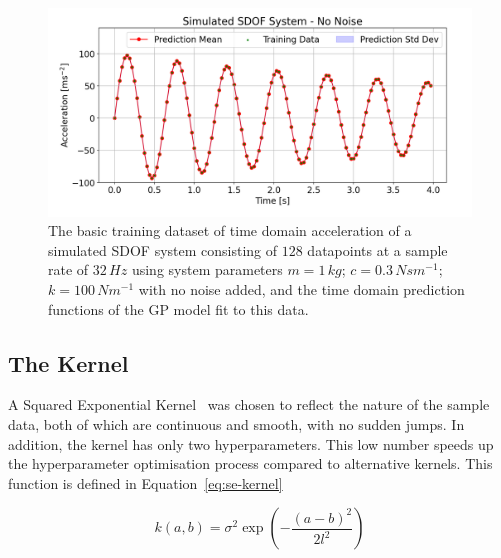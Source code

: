 \documentclass[12pt]{article}
\begin{document}
    \begin{figure}[h]
        \centering
        \includegraphics[width=1.0\linewidth]{figures/basic-data-time-domain/basic-data-time-domain.png}
        \caption{The basic training dataset of time domain acceleration of a simulated SDOF system consisting of $128$ datapoints at a sample rate of $32 \, Hz$ using system parameters $m = 1 \, kg$; $c = 0.3 \, Nsm^{-1}$; $k = 100 \, Nm^{-1}$ with no noise added, and the time domain prediction functions of the GP model fit to this data.}
        \label{fig:basic-data-time-domain}
    \end{figure}


    \subsection{The Kernel}
    A Squared Exponential Kernel~\cite{duvenaud2014kernel} was chosen to reflect the nature of the sample data, both of which are continuous and smooth, with no sudden jumps.
    In addition, the kernel has only two hyperparameters.
    This low number speeds up the hyperparameter optimisation process compared to alternative kernels.
    This function is defined in Equation~\ref{eq:se-kernel}

    \begin{equation}
        k(a,b) = \sigma^2 \exp\left(-\frac{(a - b)^2}{2l^2}\right) \label{eq:se-kernel}
    \end{equation}
\end{document}
